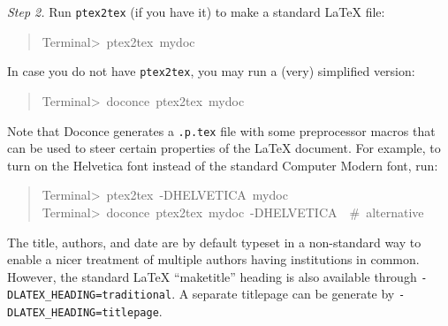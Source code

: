 \documentclass[a4paper]{article}
\begin{document}
\emph{Step 2.} Run \texttt{ptex2tex} (if you have it) to make a standard LaTeX file:
%
\begin{quote}{\ttfamily \raggedright \noindent
Terminal>~ptex2tex~mydoc
}
\end{quote}

In case you do not have \texttt{ptex2tex}, you may run a (very) simplified version:
%
\begin{quote}{\ttfamily \raggedright \noindent
Terminal>~doconce~ptex2tex~mydoc
}
\end{quote}

Note that Doconce generates a \texttt{.p.tex} file with some preprocessor macros
that can be used to steer certain properties of the LaTeX document.
For example, to turn on the Helvetica font instead of the standard
Computer Modern font, run:
%
\begin{quote}{\ttfamily \raggedright \noindent
Terminal>~ptex2tex~-DHELVETICA~mydoc\\
Terminal>~doconce~ptex2tex~mydoc~-DHELVETICA~~\#~alternative
}
\end{quote}

The title, authors, and date are by default typeset in a non-standard
way to enable a nicer treatment of multiple authors having
institutions in common. However, the standard LaTeX ``maketitle'' heading
is also available through \texttt{-DLATEX\_HEADING=traditional}.
A separate titlepage can be generate by
\texttt{-DLATEX\_HEADING=titlepage}.
\end{document}
